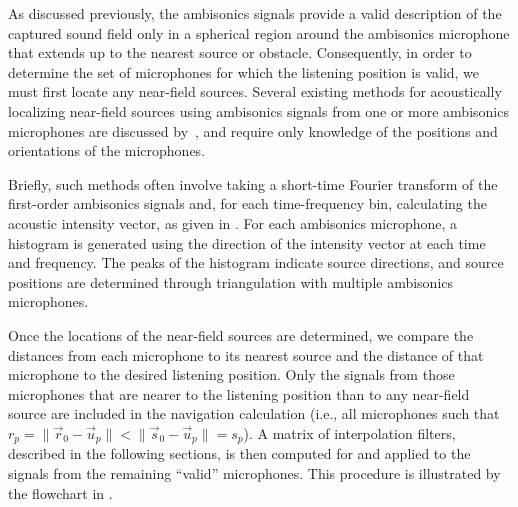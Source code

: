 As discussed previously, the ambisonics signals provide a valid description of the captured sound field only in a spherical region around the ambisonics microphone that extends up to the nearest source or obstacle.
Consequently, in order to determine the set of microphones for which the listening position is valid, we must first locate any near-field sources.
Several existing methods for acoustically localizing near-field sources using ambisonics signals from one or more ambisonics microphones are discussed by~\citet[chapter 3]{Zheng2013PhD}, and require only knowledge of the positions and orientations of the microphones.%

Briefly, such methods often involve taking a short-time Fourier transform of the first-order ambisonics signals and, for each time-frequency bin, calculating the acoustic intensity vector, as given in . %
For each ambisonics microphone, a histogram is generated using the direction of the intensity vector at each time and frequency.
The peaks of the histogram indicate source directions, and source positions are determined through triangulation with multiple ambisonics microphones.

Once the locations of the near-field sources are determined, we compare the distances from each microphone to its nearest source and the distance of that microphone to the desired listening position.
Only the signals from those microphones that are nearer to the listening position than to any near-field source are included in the navigation calculation (i.e., all microphones such that $r_p = \|\vec{r}_0 - \vec{u}_p\| < \|\vec{s}_0 - \vec{u}_p\| = s_p$).
A matrix of interpolation filters, described in the following sections, is then computed for and applied to the signals from the remaining ``valid'' microphones.
This procedure is illustrated by the flowchart in .

